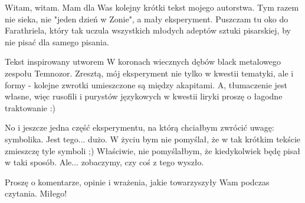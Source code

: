 \documentclass[../MAIN.tex]{subfiles}
\begin{document}
Witam, witam. Mam dla Was kolejny krótki tekst mojego autorstwa. Tym razem nie sieka, nie "jeden dzień w Zonie", a mały eksperyment. Puszczam tu oko do Farathriela, który tak uczula wszystkich młodych adeptów sztuki pisarskiej, by nie pisać dla samego pisania.

Tekst inspirowany utworem W koronach wiecznych dębów 
black metalowego zespołu Temnozor. Zresztą, mój eksperyment nie tylko w kwestii tematyki, ale i formy - kolejne zwrotki umieszczone są między akapitami. A, tłumaczenie jest własne, więc rusofili i purystów językowych w kwestii liryki proszę o łagodne traktowanie :)

No i jeszcze jedna część eksperymentu, na którą chciałbym zwrócić uwagę: symbolika. Jest tego... dużo. W życiu bym nie pomyślał, że w tak krótkim tekście zmieszczę tyle symboli ;) Właściwie, nie pomyślałbym, że kiedykolwiek będę pisał w taki sposób. Ale... zobaczymy, czy coś z tego wyszło.

Proszę o komentarze, opinie i wrażenia, jakie towarzyszyły Wam podczas czytania. Miłego!
\end{document}
